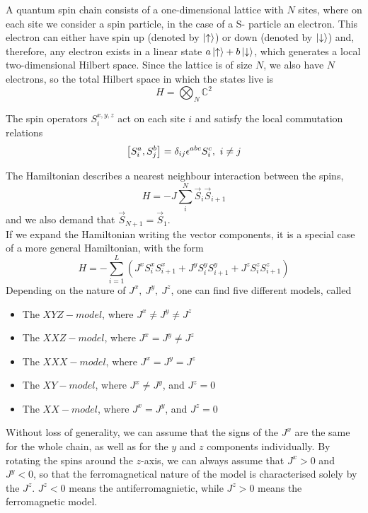 \documentclass[../intro.tex,../../main.tex]{subfiles}
\begin{document}
A quantum spin chain consists of a one-dimensional lattice with $N$ sites, where on each site we consider a spin particle, in the case of a S- particle an electron. This electron can either have spin up (denoted by $\ket{\uparrow}$) or down (denoted by $\ket{\downarrow}$) and, therefore, any electron exists in a linear state $a\ket{\uparrow} + b\ket{\downarrow}$, which generates a local two-dimensional Hilbert space. Since the lattice is of size $N$, we also have $N$ electrons, so the total Hilbert space in which the states live is
\begin{equation}
    H=\bigotimes_{N}\mathbb{C}^{2}
\end{equation}

The spin operators $S_{i}^{x,y,z}$ act on each site $i$ and satisfy the local commutation relations
\begin{equation}
    \comm{S_{i}^{a}}{S_{j}^{b}}=\delta_{ij}\epsilon^{abc}S_{i}^{c},\ i\ne j
\end{equation}

The Hamiltonian describes a nearest neighbour interaction between the spins,
\begin{equation}
    H=-J\sum_{i}^{N}\vec{S}_{i}\vec{S}_{i+1}
\end{equation}
and we also demand that $\vec{S}_{N+1}=\vec{S}_{1}$.\\

If we expand the Hamiltonian writing the vector components, it is a special case of a more general Hamiltonian, with the form
\begin{equation}
    H=-\sum_{i=1}^{L} (J^{x}S_{i}^{x}S_{i+1}^{x} +J^{y}S_{i}^{y}S_{i+1}^{y} +J^{z}S_{i}^{z}S_{i+1}^{z})
\end{equation}
Depending on the nature of $J^{x},\ J^{y},\ J^{z}$, one can find five different models, called
\begin{itemize}
    \item The $XYZ-model$, where $J^{x}\ne J^{y}\ne J^{z}$
    \item The $XXZ-model$, where $J^{x}=J^{y}\ne J^{z}$
    \item The $XXX-model$, where $J^{x}=J^{y}=J^{z}$
    \item The $XY-model$, where $J^{x}\ne J^{y}$, and $J^{z}=0$
    \item The $XX-model$, where $J^{x}=J^{y}$, and $J^{z}=0$
\end{itemize}
Without loss of generality, we can assume that the signs of the $J^{x}$ are the same for the whole chain, as well as for the $y$ and $z$ components individually. By rotating the spins around the $z$-axis, we can always assume that $J^{x}>0$ and $J^{y}<0$, so that the ferromagnetical nature of the model is characterised solely by the $J^{z}$. $J^{z}<0$ means the antiferromagnietic, while $J^{z}>0$ means the ferromagnetic model.\\
\end{document}
